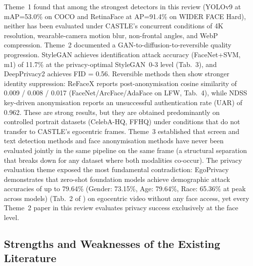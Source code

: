 \documentclass[12pt, onecolumn]{IEEEtran}
\begin{document}
Theme~1 found that among the strongest detectors in this review (YOLOv9
\cite{wang2024yolov9} at mAP=53.0\% on COCO and RetinaFace
\cite{deng2020retinaface} at AP=91.4\% on WIDER FACE Hard), neither has
been evaluated under CASTLE's concurrent conditions of 4K resolution,
wearable-camera motion blur, non-frontal angles, and WebP compression.
Theme~2 documented a GAN-to-diffusion-to-reversible quality progression.
StyleGAN \cite{khorzooghi2023gan} achieves identification attack
accuracy (FaceNet+SVM, m1) of 11.7\% at the privacy-optimal
StyleGAN~0-3 level (Tab.~3), and DeepPrivacy2
\cite{hukkelas2023deepprivacy2} achieves FID = 0.56. Reversible
methods then show stronger identity suppression: ReFaceX
\cite{muhammad2026refacex} reports post-anonymisation cosine similarity
of 0.009 / 0.008 / 0.017 (FaceNet/ArcFace/AdaFace on LFW, Tab.~4), while
NDSS key-driven anonymisation \cite{zhang2025keydriven} reports an
unsuccessful authentication rate (UAR) of 0.962. These are strong
results, but they are obtained predominantly on controlled portrait
datasets (CelebA-HQ, FFHQ) under conditions that do not transfer to
CASTLE's egocentric frames. Theme~3 established that screen and text detection methods
\cite{li2026screen,liao2020dbnet,baek2019craft,li2023trocr} and face
anonymisation methods
\cite{khorzooghi2023gan,meden2023cppdeidentification,hukkelas2023deepprivacy2,ilic2024selective,iravantchi2024privacylens,he2024diffprivacy,you2024difp,kung2026reverse,muhammad2026refacex,kung2025face,hellmann2024ganonymization,khan2024survey,lopez2024privacy,zhang2025keydriven,thapar2021anonymizing}
have never been evaluated jointly in the same pipeline on the same frame
(a structural separation that breaks down for any dataset where both
modalities co-occur). The privacy evaluation theme exposed the most fundamental
contradiction: EgoPrivacy \cite{li2025egoprivacy} demonstrates that
zero-shot foundation models achieve demographic attack accuracies of up
to 79.64\% (Gender: 73.15\%, Age: 79.64\%, Race: 65.36\% at peak across models) (Tab.~2 of \cite{li2025egoprivacy}) on egocentric
video without any face access, yet every Theme~2 paper in this review
evaluates privacy success exclusively at the face level.

\subsection{Strengths and Weaknesses of the Existing Literature}
\end{document}
